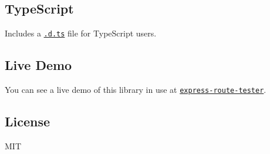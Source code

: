 \subsection*{Type\+Script}

Includes a \href{index.d.ts}{\tt {\ttfamily .d.\+ts}} file for Type\+Script users.

\subsection*{Live Demo}

You can see a live demo of this library in use at \href{http://forbeslindesay.github.com/express-route-tester/}{\tt express-\/route-\/tester}.

\subsection*{License}

M\+IT 